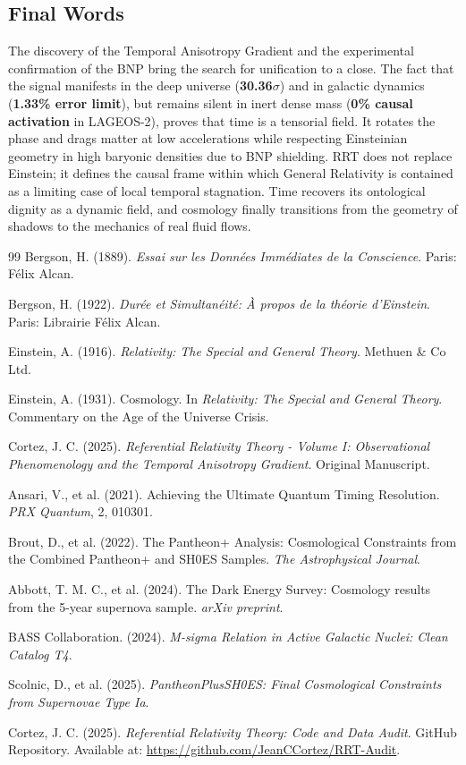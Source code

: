 \documentclass[12pt,a4paper]{article}
\begin{document}
\subsection{Final Words}
The discovery of the Temporal Anisotropy Gradient and the experimental confirmation of the BNP bring the search for unification to a close. The fact that the signal manifests in the deep universe (\textbf{30.36$\sigma$}) and in galactic dynamics (\textbf{1.33\% error limit}), but remains silent in inert dense mass (\textbf{0\% causal activation} in LAGEOS-2), proves that time is a tensorial field. It rotates the phase and drags matter at low accelerations while respecting Einsteinian geometry in high baryonic densities due to BNP shielding. RRT does not replace Einstein; it defines the causal frame within which General Relativity is contained as a limiting case of local temporal stagnation. Time recovers its ontological dignity as a dynamic field, and cosmology finally transitions from the geometry of shadows to the mechanics of real fluid flows.

\newpage
\begin{thebibliography}{99}
 Bergson, H. (1889). \textit{Essai sur les Données Immédiates de la Conscience}. Paris: Félix Alcan.

 Bergson, H. (1922). \textit{Durée et Simultanéité: À propos de la théorie d'Einstein}. Paris: Librairie Félix Alcan.

 Einstein, A. (1916). \textit{Relativity: The Special and General Theory}. Methuen \& Co Ltd.

 Einstein, A. (1931). Cosmology. In \textit{Relativity: The Special and General Theory}. Commentary on the Age of the Universe Crisis.

 Cortez, J. C. (2025). \textit{Referential Relativity Theory - Volume I: Observational Phenomenology and the Temporal Anisotropy Gradient}. Original Manuscript.

 Ansari, V., et al. (2021). Achieving the Ultimate Quantum Timing Resolution. \textit{PRX Quantum}, 2, 010301.

 Brout, D., et al. (2022). The Pantheon+ Analysis: Cosmological Constraints from the Combined Pantheon+ and SH0ES Samples. \textit{The Astrophysical Journal}.

 Abbott, T. M. C., et al. (2024). The Dark Energy Survey: Cosmology results from the 5-year supernova sample. \textit{arXiv preprint}.

 BASS Collaboration. (2024). \textit{M-sigma Relation in Active Galactic Nuclei: Clean Catalog T4}.

 Scolnic, D., et al. (2025). \textit{PantheonPlusSH0ES: Final Cosmological Constraints from Supernovae Type Ia}.

 Cortez, J. C. (2025). \textit{Referential Relativity Theory: Code and Data Audit}. GitHub Repository. Available at: \url{https://github.com/JeanCCortez/RRT-Audit}.
\end{thebibliography}
\end{document}

